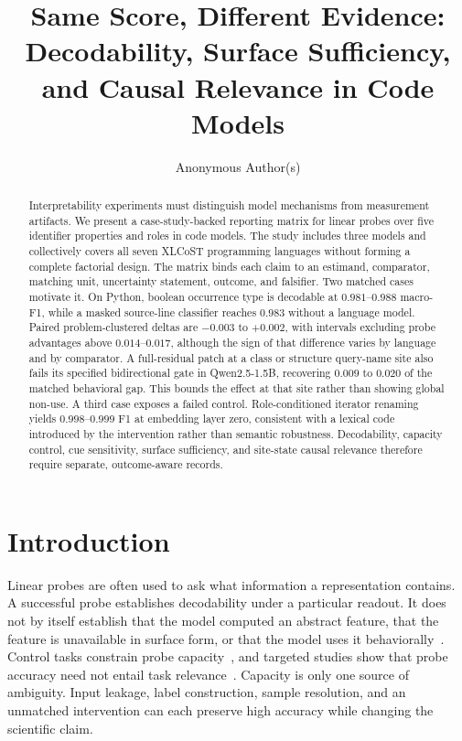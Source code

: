 \documentclass{article}
\title{Same Score, Different Evidence:\\Decodability, Surface Sufficiency, and Causal Relevance in Code Models}
\author{Anonymous Author(s)}
\begin{document}
\maketitle

\begin{abstract}
Interpretability experiments must distinguish model mechanisms from
measurement artifacts. We present a case-study-backed reporting matrix for
linear probes over five identifier properties and roles in code models. The
study includes three models and collectively covers all seven XLCoST
programming languages without forming a complete factorial design. The matrix
binds each claim to an estimand, comparator, matching unit, uncertainty
statement, outcome, and falsifier. Two matched cases motivate it. On Python,
boolean occurrence type is decodable at $0.981$--$0.988$ macro-F1, while a
masked source-line classifier reaches $0.983$ without a language model.
Paired problem-clustered deltas are $-0.003$ to $+0.002$, with intervals
excluding probe advantages above $0.014$--$0.017$, although the sign of that
difference varies by language and by comparator. A full-residual patch at a
class or structure query-name site also fails its specified bidirectional gate
in Qwen2.5-1.5B, recovering $0.009$ to $0.020$ of the matched behavioral gap.
This bounds the effect at that site rather than showing global non-use. A
third case exposes a failed control. Role-conditioned iterator renaming yields
$0.998$--$0.999$ F1 at embedding layer zero, consistent with a lexical code
introduced by the intervention rather than semantic robustness. Decodability,
capacity control, cue sensitivity, surface sufficiency, and site-state causal
relevance therefore require separate, outcome-aware records.
\end{abstract}

\section{Introduction}

Linear probes are often used to ask what information a representation contains.
A successful probe establishes decodability under a particular readout. It
does not by itself establish that the model computed an abstract feature, that
the feature is unavailable in surface form, or that the model uses it
behaviorally~\citep{belinkov2022probing,voita2020mdl}. Control tasks constrain
probe capacity~\citep{hewitt2019control}, and targeted studies show that probe
accuracy need not entail task relevance~\citep{ravichander2021probing,
elazar2021amnesic}. Capacity is only one source of
ambiguity. Input leakage, label construction, sample resolution, and an
unmatched intervention can each preserve high accuracy while changing the
scientific claim.
\end{document}
